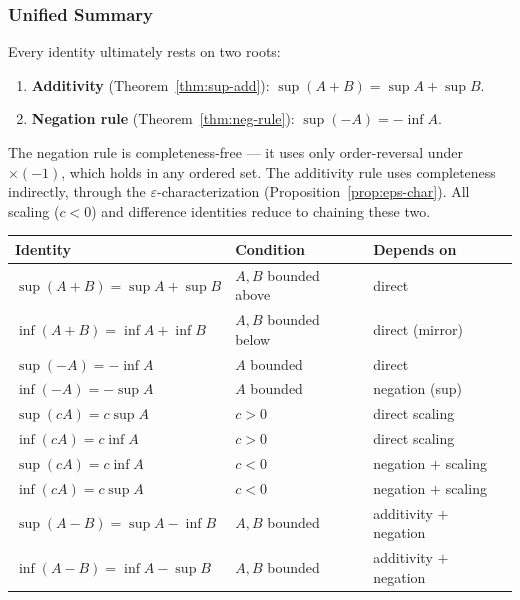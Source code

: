 \subsubsection{Unified Summary}

\begin{remark*}
Every identity ultimately rests on two roots:
\begin{enumerate}
  \item \textbf{Additivity}
        (Theorem~\ref{thm:sup-add}):
        $\sup(A+B) = \sup A + \sup B$.
  \item \textbf{Negation rule}
        (Theorem~\ref{thm:neg-rule}):
        $\sup(-A) = -\inf A$.
\end{enumerate}
The negation rule is completeness-free — it uses only order-reversal under
$\times(-1)$, which holds in any ordered set.
The additivity rule uses completeness indirectly, through the
$\varepsilon$-characterization (Proposition~\ref{prop:eps-char}).
All scaling ($c < 0$) and difference identities reduce to chaining these two.
\end{remark*}

\begin{tcolorbox}[colback=gray!6, colframe=gray!40, arc=2pt,
  left=6pt, right=6pt, top=4pt, bottom=4pt,
  title={\small\textbf{All identities and dependencies}},
  fonttitle=\small\bfseries]
\renewcommand{\arraystretch}{1.5}
\small
\begin{tabular}{@{}p{} p{} p{}@{}}
\textbf{Identity} & \textbf{Condition} & \textbf{Depends on} \\
\midrule
$\sup(A+B)=\sup A+\sup B$  & $A,B$ bounded above & direct \\
$\inf(A+B)=\inf A+\inf B$  & $A,B$ bounded below & direct (mirror) \\
$\sup(-A)=-\inf A$         & $A$ bounded         & direct \\
$\inf(-A)=-\sup A$         & $A$ bounded         & negation (sup) \\
$\sup(cA)=c\sup A$         & $c>0$               & direct scaling \\
$\inf(cA)=c\inf A$         & $c>0$               & direct scaling \\
$\sup(cA)=c\inf A$         & $c<0$               & negation $+$ scaling \\
$\inf(cA)=c\sup A$         & $c<0$               & negation $+$ scaling \\
$\sup(A-B)=\sup A-\inf B$  & $A,B$ bounded       & additivity $+$ negation \\
$\inf(A-B)=\inf A-\sup B$  & $A,B$ bounded       & additivity $+$ negation \\
\end{tabular}
\end{tcolorbox}

